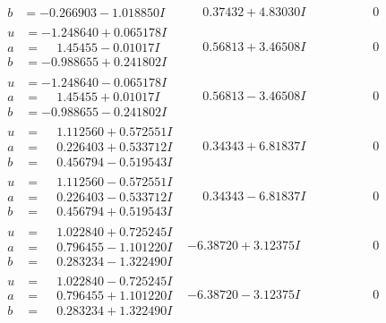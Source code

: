 \documentclass[1p]{elsarticle_modified}
\theoremstyle{definition}
\begin{document}
$$\begin{array}{c|c|c}
\begin{aligned}
b &= -0.266903 - 1.018850 I\end{aligned}
 & \phantom{-}0.37432 + 4.83030 I & \phantom{-0.000000 } 0 \\ \hline\begin{aligned}
u &= -1.248640 + 0.065178 I \\
a &= \phantom{-}1.45455 - 0.01017 I \\
b &= -0.988655 + 0.241802 I\end{aligned}
 & \phantom{-}0.56813 + 3.46508 I & \phantom{-0.000000 } 0 \\ \hline\begin{aligned}
u &= -1.248640 - 0.065178 I \\
a &= \phantom{-}1.45455 + 0.01017 I \\
b &= -0.988655 - 0.241802 I\end{aligned}
 & \phantom{-}0.56813 - 3.46508 I & \phantom{-0.000000 } 0 \\ \hline\begin{aligned}
u &= \phantom{-}1.112560 + 0.572551 I \\
a &= \phantom{-}0.226403 + 0.533712 I \\
b &= \phantom{-}0.456794 - 0.519543 I\end{aligned}
 & \phantom{-}0.34343 + 6.81837 I & \phantom{-0.000000 } 0 \\ \hline\begin{aligned}
u &= \phantom{-}1.112560 - 0.572551 I \\
a &= \phantom{-}0.226403 - 0.533712 I \\
b &= \phantom{-}0.456794 + 0.519543 I\end{aligned}
 & \phantom{-}0.34343 - 6.81837 I & \phantom{-0.000000 } 0 \\ \hline\begin{aligned}
u &= \phantom{-}1.022840 + 0.725245 I \\
a &= \phantom{-}0.796455 - 1.101220 I \\
b &= \phantom{-}0.283234 - 1.322490 I\end{aligned}
 & -6.38720 + 3.12375 I & \phantom{-0.000000 } 0 \\ \hline\begin{aligned}
u &= \phantom{-}1.022840 - 0.725245 I \\
a &= \phantom{-}0.796455 + 1.101220 I \\
b &= \phantom{-}0.283234 + 1.322490 I\end{aligned}
 & -6.38720 - 3.12375 I & \phantom{-0.000000 } 0 \\ \hline\begin{aligned}

\end{aligned}
\end{array}$$
\end{document}
